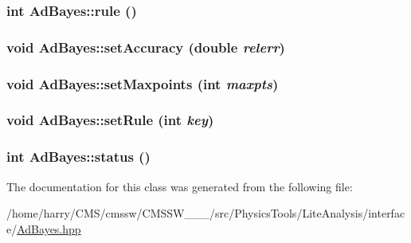 \hypertarget{classAdBayes_a10}{
\subsubsection[rule]{\setlength{\rightskip}{0pt plus 5cm}int Ad\-Bayes::rule ()}}
\label{classAdBayes_a10}


\hypertarget{classAdBayes_a6}{
\subsubsection[setAccuracy]{\setlength{\rightskip}{0pt plus 5cm}void Ad\-Bayes::set\-Accuracy (double {\em relerr})}}
\label{classAdBayes_a6}


\hypertarget{classAdBayes_a5}{
\subsubsection[setMaxpoints]{\setlength{\rightskip}{0pt plus 5cm}void Ad\-Bayes::set\-Maxpoints (int {\em maxpts})}}
\label{classAdBayes_a5}


\hypertarget{classAdBayes_a7}{
\subsubsection[setRule]{\setlength{\rightskip}{0pt plus 5cm}void Ad\-Bayes::set\-Rule (int {\em key})}}
\label{classAdBayes_a7}


\hypertarget{classAdBayes_a14}{
\subsubsection[status]{\setlength{\rightskip}{0pt plus 5cm}int Ad\-Bayes::status ()}}
\label{classAdBayes_a14}




The documentation for this class was generated from the following file:\begin{CompactItemize}
\item 
/home/harry/CMS/cmssw/CMSSW\_\_\_/src/Physics\-Tools/Lite\-Analysis/interface/\hyperlink{AdBayes_8hpp}{Ad\-Bayes.hpp}\end{CompactItemize}
